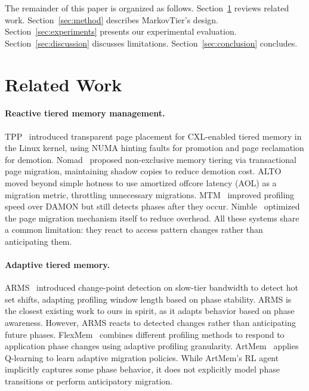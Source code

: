 \documentclass[preprint]{article}
\begin{document}
The remainder of this paper is organized as follows. Section~\ref{sec:related} reviews related work. Section~\ref{sec:method} describes MarkovTier's design. Section~\ref{sec:experiments} presents our experimental evaluation. Section~\ref{sec:discussion} discusses limitations. Section~\ref{sec:conclusion} concludes.

\section{Related Work}
\label{sec:related}

\paragraph{Reactive tiered memory management.}
TPP~\citep{maruf2023tpp} introduced transparent page placement for CXL-enabled tiered memory in the Linux kernel, using NUMA hinting faults for promotion and page reclamation for demotion. Nomad~\citep{xiang2024nomad} proposed non-exclusive memory tiering via transactional page migration, maintaining shadow copies to reduce demotion cost. ALTO~\citep{liu2025hotness} moved beyond simple hotness to use amortized offcore latency (AOL) as a migration metric, throttling unnecessary migrations. MTM~\citep{xu2024mtm} improved profiling speed over DAMON but still detects phases after they occur. Nimble~\citep{yan2019nimble} optimized the page migration mechanism itself to reduce overhead. All these systems share a common limitation: they react to access pattern changes rather than anticipating them.

\paragraph{Adaptive tiered memory.}
ARMS~\citep{yadalam2025arms} introduced change-point detection on slow-tier bandwidth to detect hot set shifts, adapting profiling window length based on phase stability. ARMS is the closest existing work to ours in spirit, as it adapts behavior based on phase awareness. However, ARMS reacts to detected changes rather than anticipating future phases. FlexMem~\citep{xu2024flexmem} combines different profiling methods to respond to application phase changes using adaptive profiling granularity. ArtMem~\citep{yi2025artmem} applies Q-learning to learn adaptive migration policies. While ArtMem's RL agent implicitly captures some phase behavior, it does not explicitly model phase transitions or perform anticipatory migration.
\end{document}
